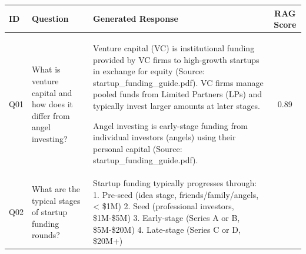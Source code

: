 \documentclass[11pt, a4paper]{article}
\begin{document}
\begin{table}[H]
\centering
\footnotesize
\begin{tabularx}{\textwidth}{|l|X|X|c|}
\hline
\textbf{ID} & \textbf{Question} & \textbf{Generated Response} & \textbf{RAG Score} \\
\hline
Q01 & What is venture capital and how does it differ from angel investing? & Venture capital (VC) is institutional funding provided by VC firms to high-growth startups in exchange for equity (Source: startup\_funding\_guide.pdf). VC firms manage pooled funds from Limited Partners (LPs) and typically invest larger amounts at later stages.

Angel investing is early-stage funding from individual investors (angels) using their personal capital (Source: startup\_funding\_guide.pdf). & 0.89 \\
\hline
Q02 & What are the typical stages of startup funding rounds? & Startup funding typically progresses through: 
1. Pre-seed (idea stage, friends/family/angels, < \$1M) 
2. Seed (professional investors, \$1M-\$5M) 
3. Early-stage (Series A or B, \$5M-\$20M) 
4. Late-stage (Series C or D, \$20M+)


\end{tabularx}
\end{table}
\end{document}
